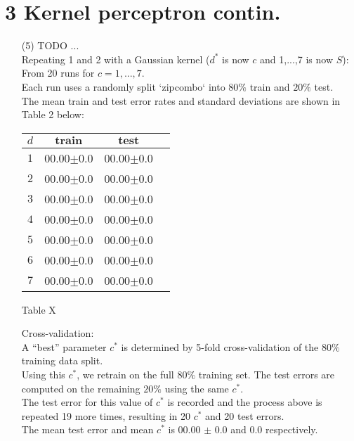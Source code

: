 \documentclass[a4paper,12pt]{article}
\begin{document}
\section*{3 Kernel perceptron contin.}
\begin{enumerate}
\item[(5)] TODO ... \\

Repeating 1 and 2 with a Gaussian kernel  ($d^*$ is now $c$ and {1,...,7} is now $S$):\\
From 20 runs for $c = 1, ... , 7$. \\
Each run uses a randomly split `zipcombo` into $80\%$ train and $20\%$ test. \\
The mean train and test error rates and standard deviations are shown in Table 2 below:

\begin{tabular}{|c|c|c|c|}
\hline
$d$&$\textbf{train}$&$\textbf{test}$\\
\hline
$1$&00.00$\pm$0.0&00.00$\pm$0.0\\
\hline
$2$&00.00$\pm$0.0&00.00$\pm$0.0\\
\hline
$3$&00.00$\pm$0.0&00.00$\pm$0.0\\
\hline
$4$&00.00$\pm$0.0&00.00$\pm$0.0\\
\hline
$5$&00.00$\pm$0.0&00.00$\pm$0.0\\
\hline
$6$&00.00$\pm$0.0&00.00$\pm$0.0\\
\hline
$7$&00.00$\pm$0.0&00.00$\pm$0.0\\
\hline
\end{tabular}\par 
Table X

Cross-validation: \\
A “best” parameter $c^*$ is determined by 5-fold cross-validation of the $80\%$ training data split. \\
Using this $c^*$, we retrain on the full $80\%$ training set. The test errors are computed on the remaining $20\%$ using the same $c^*$. \\
The test error for this value of $c^*$ is recorded and the process above is repeated 19 more times, resulting in 20 $c^*$ and 20 test errors.\\
The mean test error and mean $c^*$ is 00.00 $\pm$ 0.0 and 0.0 respectively.



\end{enumerate}
\clearpage
\end{document}

